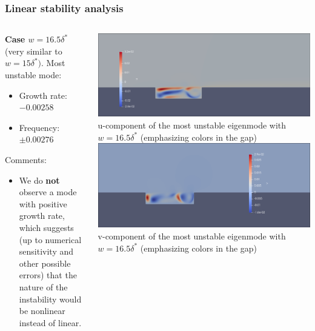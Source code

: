 \documentclass[
  aspectratio=169, %
  t, %
  onlytextwidth, %
  10pt, %
]{beamer}
\begin{document}
\begin{frame}
  \frametitle{Linear stability analysis}
  \begin{columns}[T] %
    \begin{column}{0.48\linewidth} %
    \textbf{Case $w = 16.5\delta^*$} (very similar to $w=15\delta^*)$. Most unstable mode:
      \begin{itemize}
	\item Growth rate: $-0.00258$
	\item Frequency: $\pm0.00276$
      \end{itemize}
      Comments:
      \begin{itemize}
	\item We do \textbf{not} observe a mode with positive growth rate, which suggests (up to numerical sensitivity and other possible errors) that the nature of the instability would be nonlinear instead of linear.
      \end{itemize}
     \end{column}
    \begin{column}{0.48\linewidth} %
      {
	\centering
	\includegraphics[width=0.9\linewidth]{Images/uem16.5.png}
	u-component of the most unstable eigenmode with $w = 16.5\delta^*$ (emphasizing colors in the gap)
      }
      {
	\centering
	\includegraphics[width=0.9\linewidth]{Images/vem16.5.png}
	v-component of the most unstable eigenmode with $w = 16.5\delta^*$ (emphasizing colors in the gap)
      }
    \end{column}
  \end{columns}
\end{frame}
\end{document}
